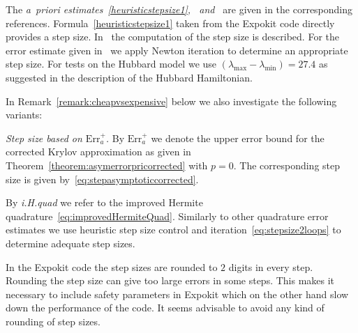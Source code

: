 \documentclass[smallextended]{svjour3pre}%
\numberwithin{equation}{section}
\numberwithin{figure}{section}
\numberwithin{table}{section}
\newcommand{\ttol}{{\rm tol}}
\newcommand\tjnew[1]{{#1}}
\newcommand\Era{\mathrm{Err}_a}
\begin{document}
\begin{description}
\item The {\em a~priori estimates~\eqref{heuristicstepsize1},~\cite[Theorem 4]{hoclub97} and~\cite[eq. (20)]{mohcar10}}
are given in the corresponding references.
Formula~\eqref{heuristicstepsize1} taken from the Expokit code directly provides a step size.
In~\cite[eq. (20)]{mohcar10} the computation of the step size is described.
For the error estimate given in~\cite[Theorem 4]{hoclub97} we apply Newton iteration to determine an appropriate step size.
{For tests on the Hubbard model we use $(\lambda_{\text{max}} - \lambda_{\text{min}}) = 27.4$ as suggested
in the description of the Hubbard Hamiltonian.}
\end{description}
In Remark~\ref{remark:cheapvsexpensive} below we also investigate the following variants:
\begin{description}
\item {\em Step size based on $\Era^+$.}
By $\Era^+$ we denote the \tjnew{upper error bound} for the corrected Krylov approximation as given in Theorem~\ref{theorem:asymerrorpricorrected} with $p=0$.
The corres\-ponding step size is given by~\eqref{eq:stepasymptoticcorrected}.
\item By {\em i.H.quad} we refer to the improved Hermite quadrature~\eqref{eq:improvedHermiteQuad}. Similarly to other quadrature error estimates we use heuristic step size control and iteration~\eqref{eq:stepsize2loops} to determine adequate step sizes.
\end{description}

\begin{remark}
In the Expokit code the step sizes are rounded to $2$ digits in every step.
Rounding the step size can give too large errors in some steps.
This makes it necessary to include safety parameters in Expokit which
on the other hand slow down the performance of the code.
It seems advisable to avoid any kind of rounding of step sizes.
\end{remark}
\end{document}
